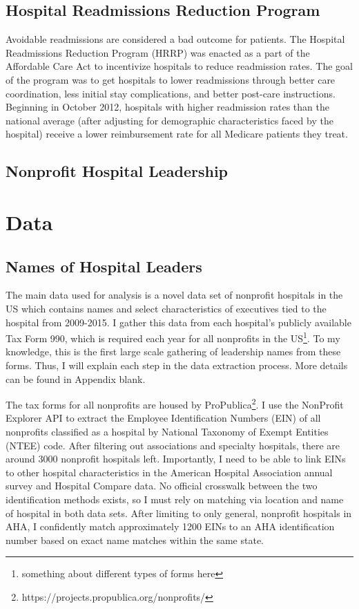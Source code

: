 \documentclass[12pt]{article}
\begin{document}
    \subsection{Hospital Readmissions Reduction Program}

    Avoidable readmissions are considered a bad outcome for patients. The Hospital Readmissions Reduction Program (HRRP) was enacted as a part of the Affordable Care Act to incentivize hospitals to reduce readmission rates. The goal of the program was to get hospitals to lower readmissions through better care coordination, less initial stay complications, and better post-care instructions. Beginning in October 2012, hospitals with higher readmission rates than the national average (after adjusting for demographic characteristics faced by the hospital) receive a lower reimbursement rate for all Medicare patients they treat. 

    \subsection{Nonprofit Hospital Leadership}

    

  
	
	\section{Data}

    \subsection{Names of Hospital Leaders}

    The main data used for analysis is a novel data set of nonprofit hospitals in the US which contains names and select characteristics of executives tied to the hospital from 2009-2015. I gather this data from each hospital's publicly available Tax Form 990, which is required each year for all nonprofits in the US\footnote{something about different types of forms here}. To my knowledge, this is the first large scale gathering of leadership names from these forms. Thus, I will explain each step in the data extraction process. More details can be found in Appendix blank.  

    The tax forms for all nonprofits are housed by ProPublica\footnote{https://projects.propublica.org/nonprofits/}. I use the NonProfit Explorer API to extract the Employee Identification Numbers (EIN) of all nonprofits classified as a hospital by National Taxonomy of Exempt Entities (NTEE) code. After filtering out associations and specialty hospitals, there are around 3000 nonprofit hospitals left. Importantly, I need to be able to link EINs to other hospital characteristics in the American Hospital Association annual survey and Hospital Compare data. No official crosswalk between the two identification methods exists, so I must rely on matching via location and name of hospital in both data sets. After limiting to only general, nonprofit hospitals in AHA, I confidently match approximately 1200 EINs to an AHA identification number based on exact name matches within the same state. 
    
\end{document}
